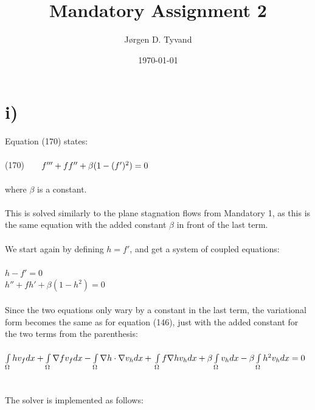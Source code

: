 \documentclass[a4paper,english,11pt,twoside]{article}
\date{\today}
\title{Mandatory Assignment 2}
\author{Jørgen D. Tyvand}
\newcommand{\tab}{\hspace*{2em}}
\begin{document}
\maketitle
\newpage

\section*{i)}
Equation (170) states:\\
\\
(170)$\tab f''' + ff'' + \beta(1 - (f')^2) = 0$\\
\\
where $\beta$ is a constant.\\
\\
This is solved similarly to the plane stagnation flows from Mandatory 1, as this is the same equation with the added constant $\beta$ in front of the last term.\\
\\
We start again by defining $h = f'$, and get a system of coupled equations:\\
\\
$h - f' = 0$\\
$h'' + fh' + \beta(1 - h^2) = 0$\\
\\
Since the two equations only wary by a constant in the last term, the variational form becomes the same as for equation (146), just with the added constant for the two terms from the parenthesis:\\
\\
$\int\limits_{\Omega}hv_fdx +\int\limits_{\Omega}\nabla f v_fdx - \int\limits_{\Omega}\nabla h\cdot\nabla v_hdx + \\
\\
\int\limits_{\Omega} f \nabla h v_hdx + \beta\int\limits_{\Omega}v_hdx - \beta\int\limits_{\Omega}h^2v_hdx = 0$\\
\\
\\
The solver is implemented as follows:
\\
\end{document}
